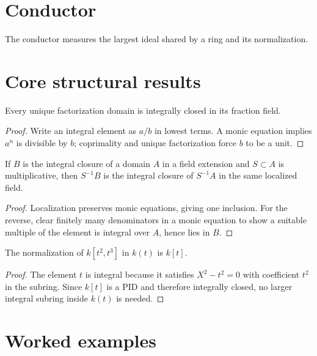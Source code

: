 \section{Conductor}
The conductor measures the largest ideal shared by a ring and its normalization.

\section{Core structural results}

\begin{theorem}\label{thm:v20-01}
Every unique factorization domain is integrally closed in its fraction field.
\begin{proof}
Write an integral element as $a/b$ in lowest terms. A monic equation implies $a^n$ is divisible by $b$; coprimality and unique factorization force $b$ to be a unit.
\end{proof}
\end{theorem}

\begin{theorem}\label{thm:v20-02}
If $B$ is the integral closure of a domain $A$ in a field extension and $S\subset A$ is multiplicative, then $S^{-1}B$ is the integral closure of $S^{-1}A$ in the same localized field.
\begin{proof}
Localization preserves monic equations, giving one inclusion. For the reverse, clear finitely many denominators in a monic equation to show a suitable multiple of the element is integral over $A$, hence lies in $B$.
\end{proof}
\end{theorem}

\begin{theorem}\label{thm:v20-03}
The normalization of $k[t^2,t^3]$ in $k(t)$ is $k[t]$.
\begin{proof}
The element $t$ is integral because it satisfies $X^2-t^2=0$ with coefficient $t^2$ in the subring. Since $k[t]$ is a PID and therefore integrally closed, no larger integral subring inside $k(t)$ is needed.
\end{proof}
\end{theorem}

\section{Worked examples}

